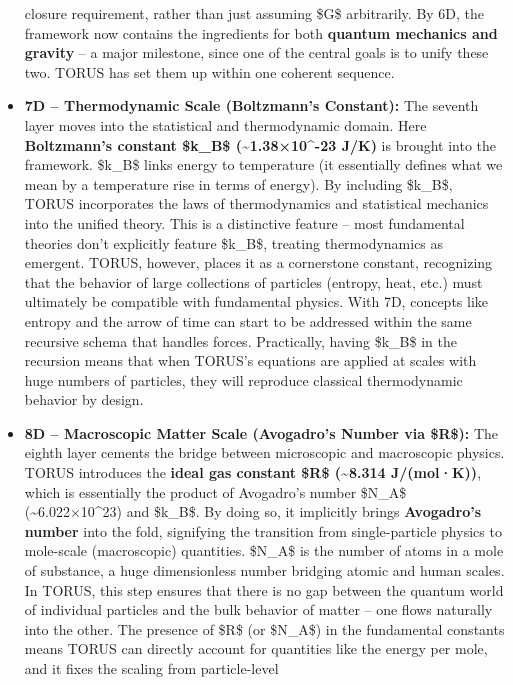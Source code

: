 \documentclass[
]{article}
\begin{document}
\begin{itemize}
  closure requirement, rather than just assuming \$G\$ arbitrarily. By
  6D, the framework now contains the ingredients for both
  \textbf{quantum mechanics and gravity} -- a major milestone, since one
  of the central goals is to unify these two. TORUS has set them up
  within one coherent sequence.
\item
  \textbf{7D -- Thermodynamic Scale (Boltzmann's Constant):} The seventh
  layer moves into the statistical and thermodynamic domain. Here
  \textbf{Boltzmann's constant \$k\_B\$ (\textasciitilde1.38×10\^{}-23
  J/K)} is brought into the framework. \$k\_B\$ links energy to
  temperature (it essentially defines what we mean by a temperature rise
  in terms of energy). By including \$k\_B\$, TORUS incorporates the
  laws of thermodynamics and statistical mechanics into the unified
  theory. This is a distinctive feature -- most fundamental theories
  don't explicitly feature \$k\_B\$, treating thermodynamics as
  emergent. TORUS, however, places it as a cornerstone constant,
  recognizing that the behavior of large collections of particles
  (entropy, heat, etc.) must ultimately be compatible with fundamental
  physics. With 7D, concepts like entropy and the arrow of time can
  start to be addressed within the same recursive schema that handles
  forces. Practically, having \$k\_B\$ in the recursion means that when
  TORUS's equations are applied at scales with huge numbers of
  particles, they will reproduce classical thermodynamic behavior by
  design.
\item
  \textbf{8D -- Macroscopic Matter Scale (Avogadro's Number via \$R\$):}
  The eighth layer cements the bridge between microscopic and
  macroscopic physics. TORUS introduces the \textbf{ideal gas constant
  \$R\$ (\textasciitilde8.314 J/(mol·K))}, which is essentially the
  product of Avogadro's number \$N\_A\$ (\textasciitilde6.022×10\^{}23)
  and \$k\_B\$\hspace{0pt}. By doing so, it implicitly brings
  \textbf{Avogadro's number} into the fold, signifying the transition
  from single-particle physics to mole-scale (macroscopic) quantities.
  \$N\_A\$ is the number of atoms in a mole of substance, a huge
  dimensionless number bridging atomic and human scales. In TORUS, this
  step ensures that there is no gap between the quantum world of
  individual particles and the bulk behavior of matter -- one flows
  naturally into the other. The presence of \$R\$ (or \$N\_A\$) in the
  fundamental constants means TORUS can directly account for quantities
  like the energy per mole, and it fixes the scaling from particle-level

\end{itemize}
\end{document}
